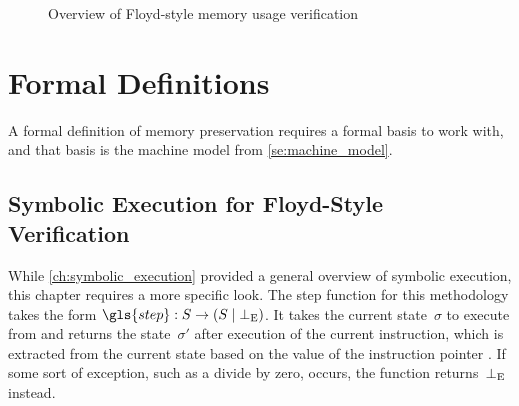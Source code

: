 \begin{figure}
  \centering
  \caption{Overview of Floyd-style memory usage verification}\label{fig:cfg_overview}
\end{figure}

\section{Formal Definitions}\label{se:cfg_defs}
A formal definition of memory preservation requires a formal basis to work with,
and that basis is the machine model from \cref{se:machine_model}.

\subsection{Symbolic Execution for Floyd-Style Verification}\label{cfg_symb_exec}
While \cref{ch:symbolic_execution} provided a general overview of symbolic execution,
this chapter requires a more specific look.
The step function for this methodology takes the form
$\gls{step}:S\rightarrow(S\mid\err)$.%
It takes the current state~$\sigma$ to execute from
and returns the state~$\sigma'$ after execution of the current instruction,
which is extracted from the current state based on the value of the instruction pointer
.
If some sort of exception, such as a divide by zero, occurs,
the function returns~$\bot_\mathrm{E}$ instead.

